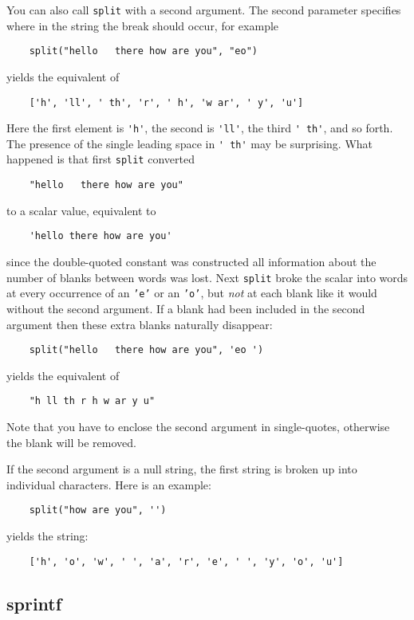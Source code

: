 You can also call
{\tt split} with a second argument.  The second parameter specifies
where in the string the break should occur, for example
\begin{verbatim}
    split("hello   there how are you", "eo")
\end{verbatim}
yields the equivalent of
\begin{verbatim}
    ['h', 'll', ' th', 'r', ' h', 'w ar', ' y', 'u']
\end{verbatim}
Here the first element is \verb+'h'+, the second is \verb+'ll'+, the
third \verb+' th'+, and so forth.  The presence of the single leading space
in \verb+' th'+ may be surprising.  What happened is that first {\tt split}
converted
\begin{verbatim}
    "hello   there how are you"
\end{verbatim}
to a scalar value, equivalent to
\begin{verbatim}
    'hello there how are you'
\end{verbatim}
since the double-quoted constant was constructed all information
about the number of blanks between words was lost.  Next {\tt split} broke
the scalar into words at every occurrence of an {\tt 'e'} or an {\tt 'o'},
but {\em not} at each blank like it would without the second argument.
If a blank had been included in the second argument then these extra
blanks naturally disappear:
\begin{verbatim}
    split("hello   there how are you", 'eo ')
\end{verbatim}
yields the equivalent of
\begin{verbatim}
    "h ll th r h w ar y u"
\end{verbatim}
Note that you have to enclose the second argument in single-quotes, otherwise
the blank will be removed.

If the second argument is a null string, the first string is broken up into
individual characters. Here is an example:
\begin{verbatim}
    split("how are you", '')
\end{verbatim}
yields the string:
\begin{verbatim}
    ['h', 'o', 'w', ' ', 'a', 'r', 'e', ' ', 'y', 'o', 'u']
\end{verbatim}

\subsection{sprintf}
\label{sprintf-func}

